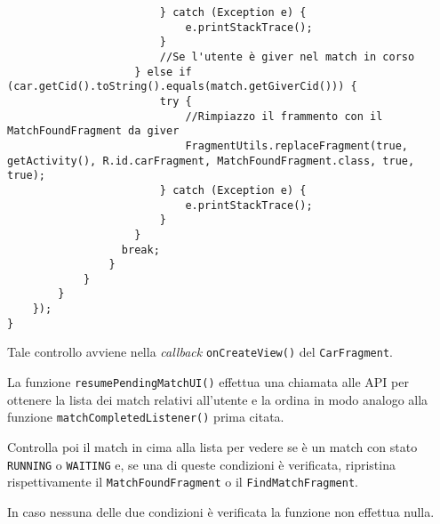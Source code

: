 \begin{lstlisting}
                        } catch (Exception e) {
                            e.printStackTrace();
                        }
                        //Se l'utente è giver nel match in corso
                    } else if (car.getCid().toString().equals(match.getGiverCid())) {
                        try {
                            //Rimpiazzo il frammento con il  MatchFoundFragment da giver
                            FragmentUtils.replaceFragment(true, getActivity(), R.id.carFragment, MatchFoundFragment.class, true, true);
                        } catch (Exception e) {
                            e.printStackTrace();
                        }
                    }
                  break;
                }
            }
        }
    });
}
\end{lstlisting}

Tale controllo avviene nella \emph{callback} \texttt{onCreateView()} del
\texttt{CarFragment}.

La funzione \texttt{resumePendingMatchUI()} effettua una chiamata alle
API per ottenere la lista dei match relativi all'utente e la ordina in
modo analogo alla funzione \texttt{matchCompletedListener()} prima
citata.

Controlla poi il match in cima alla lista per vedere se è un match con
stato \texttt{RUNNING} o \texttt{WAITING} e, se una di queste condizioni
è verificata, ripristina rispettivamente il \texttt{MatchFoundFragment}
o il \texttt{FindMatchFragment}.

In caso nessuna delle due condizioni è verificata la funzione non
effettua nulla.